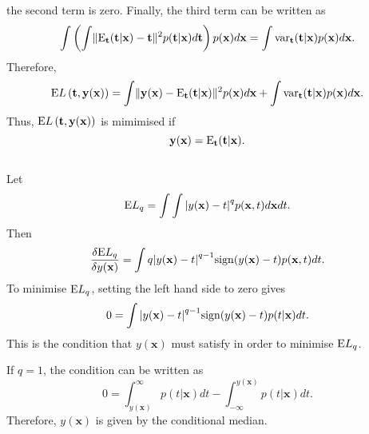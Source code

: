%
the second term is zero.
Finally, the third term can be written as
%
\begin{equation}
\int \left( \int \lVert {\rm E}_\mathbf{t} (\mathbf{t} | \mathbf{x}) - \mathbf{t} \rVert ^ 2 p(\mathbf{t} | \mathbf{x}) d\mathbf{t} \right) p(\mathbf{x}) d\mathbf{x} = \int {\rm var}_{\mathbf{t}} (\mathbf{t} | \mathbf{x}) p(\mathbf{x}) d\mathbf{x}.
\end{equation}
%
Therefore,
%
\begin{equation}
{\rm E} L\left( \mathbf{t}, \mathbf{y} (\mathbf{x}) \right) = \int \lVert \mathbf{y}(\mathbf{x}) - {\rm E}_\mathbf{t} (\mathbf{t} | \mathbf{x}) \rVert ^ 2 p(\mathbf{x}) d\mathbf{x} + \int {\rm var}_{\mathbf{t}} (\mathbf{t} | \mathbf{x}) p(\mathbf{x}) d\mathbf{x}.
\end{equation}
%
Thus, ${\rm E} L\left( \mathbf{t}, \mathbf{y} (\mathbf{x}) \right)$ is mimimised if
%
\begin{equation}
\mathbf{y} (\mathbf{x}) = {\rm E}_\mathbf{t} (\mathbf{t} | \mathbf{x}).
\end{equation}


\subsection{}
Let
%
\begin{equation}
{\rm E} L_q = \int \int \abs{y(\mathbf{x}) - t} ^ q p(\mathbf{x}, t) d\mathbf{x} dt.
\end{equation}
%
Then
%
\begin{equation}
\frac{\delta {\rm E} L_q}{\delta y (\mathbf{x})} = \int q \abs{y(\mathbf{x}) - t} ^ {q - 1} {\rm sign} (y(\mathbf{x}) - t) p(\mathbf{x}, t) dt.
\end{equation}
%
To minimise ${\rm E} L_q$, setting the left hand side to zero gives
%
\begin{equation}
0 = \int \abs{y(\mathbf{x}) - t} ^ {q - 1} {\rm sign} (y(\mathbf{x}) - t) p(t | \mathbf{x}) dt.
\end{equation}
%
This is the condition that $y(\mathbf{x})$ must satisfy in order to minimise ${\rm E} L_q$.

If $q = 1$, the condition can be written as
%
\begin{equation}
0 = \int_{y(\mathbf{x})}^{\infty} p(t | \mathbf{x}) dt - \int_{- \infty}^{y(\mathbf{x})} p(t | \mathbf{x}) dt.
\end{equation}
%
Therefore, $y(\mathbf{x})$ is given by the conditional median.


